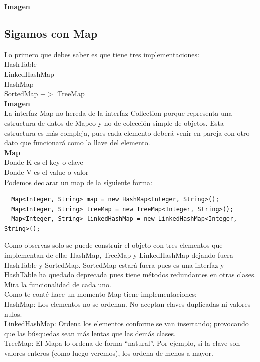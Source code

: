 \documentclass{article}
\begin{document}
\textbf{Imagen}\\



\subsection*{Sigamos con Map}%
Lo primero que debes saber es que tiene tres implementaciones:\\

HashTable\\
LinkedHashMap\\
HashMap\\
SortedMap $->$ TreeMap\\



\textbf{Imagen}\\



La interfaz Map no hereda de la interfaz Collection porque representa una
estructura de datos de Mapeo y no de colección simple de objetos. Esta
estructura es más compleja, pues cada elemento deberá venir en pareja con otro
dato que funcionará como la llave del elemento.\\


\textbf{Map}\\
Donde K es el key o clave\\
Donde V es el value o valor\\

Podemos declarar un map de la siguiente forma:\\

\begin{verbatim}
  Map<Integer, String> map = new HashMap<Integer, String>();
  Map<Integer, String> treeMap = new TreeMap<Integer, String>();
  Map<Integer, String> linkedHashMap = new LinkedHashMap<Integer, String>();
\end{verbatim}

Como observas solo se puede construir el objeto con tres elementos que
implementan de ella: HashMap, TreeMap y LinkedHashMap dejando fuera HashTable y
SortedMap. SortedMap estará fuera pues es una interfaz y HashTable ha quedado
deprecada pues tiene métodos redundantes en otras clases. Mira la funcionalidad
de cada uno.\\

Como te conté hace un momento Map tiene implementaciones:\\

HashMap: Los elementos no se ordenan. No aceptan claves duplicadas ni valores
nulos.\\
LinkedHashMap: Ordena los elementos conforme se van insertando; provocando que
las búsquedas sean más lentas que las demás clases.\\
TreeMap: El Mapa lo ordena de forma “natural”. Por ejemplo, si la clave son
valores enteros (como luego veremos), los ordena de menos a mayor.\\
\end{document}
